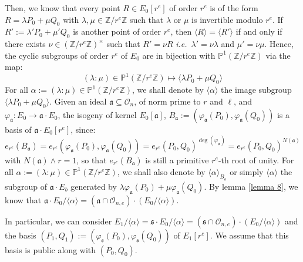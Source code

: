 \documentclass[a4paper,10pt]{report}
\theoremstyle{definition}
\theoremstyle{plain}
\theoremstyle{definition}
\newcommand{\ie}{\emph{i.e.}\ }
\newcommand{\Z}{\mathbb{Z}}
\newcommand{\mO}{\mathcal{O}}
\renewcommand{\(}{\left(}
\renewcommand{\)}{\right)}
\renewcommand{\P}{\mathbb{P}}
\newcommand{\mf}[1]{\mathfrak{#1}}
\begin{document}
Then, we know that every point $R\in E_0[r^e]$ of order $r^e$ is of the form $R=\lambda P_0+\mu Q_0$ with $\lambda,\mu\in\Z/r^e\Z$ such that $\lambda$ or $\mu$ is invertible modulo $r^e$.  If $R':=\lambda'P_0+\mu'Q_0$ is another point of order $r^e$, then $\langle R\rangle=\langle R'\rangle$ if and only if there exists $\nu\in(\Z/r^e\Z)^\times$ such that $R'=\nu R$ \ie  $\lambda'=\nu\lambda$ and $\mu'=\nu\mu$. Hence, the cyclic subgroups of order $r^e$ of $E_0$ are in bijection with $\P^1(\Z/r^e\Z)$ via the map:
\[(\lambda:\mu)\in\P^1(\Z/r^e\Z)\longmapsto \langle \lambda P_0+\mu Q_0\rangle\]
For all $\alpha:=(\lambda:\mu)\in\P^1(\Z/r^e\Z)$, we shall denote by $\langle\alpha\rangle$ the image subgroup $\langle \lambda P_0+\mu Q_0\rangle$. Given an ideal $\mf{a}\subseteq \mO_n$, of norm prime to $r$ and $\ell$, and $\varphi_{\mf{a}}: E_0\longrightarrow \mf{a}\cdot E_0$, the isogeny of kernel $E_0[\mf{a}]$, $B_{\mf{a}}:=(\varphi_{\mf{a}}(P_0), \varphi_{\mf{a}}(Q_0))$ is a basis of $\mf{a}\cdot E_0[r^e]$, since:
\[e_{r^e}(B_{\mf{a}})=e_{r^e}(\varphi_{\mf{a}}(P_0), \varphi_{\mf{a}}(Q_0))=e_{r^e}(P_0,Q_0)^{\deg(\varphi_{\mf{a}})}=e_{r^e}(P_0,Q_0)^{N(\mf{a})}\]
with $N(\mf{a})\wedge r=1$, so that $e_{r^e}(B_{\mf{a}})$ is still a primitive $r^e$-th root of unity.  For all $\alpha:=(\lambda:\mu)\in\P^1(\Z/r^e\Z)$, we shall also denote by $\langle \alpha\rangle_{B_{\mf{a}}}$ or simply $\langle \alpha\rangle$ the subgroup of $\mf{a}\cdot E_b$ generated by $\lambda\varphi_{\mf{a}}(P_0)+\mu\varphi_{\mf{a}}(Q_0)$. By lemma \ref{lemma 8}, we know that $\mf{a}\cdot E_0/\langle\alpha\rangle=(\mf{a}\cap\mO_{n,e})\cdot(E_0/\langle\alpha\rangle)$. 

In particular, we can consider $E_1/\langle\alpha\rangle=\mf{s}\cdot E_0/\langle\alpha\rangle=(\mf{s}\cap\mO_{n,e})\cdot(E_0/\langle\alpha\rangle)$ and the basis $(P_1,Q_1):=(\varphi_{\mf{s}}(P_0), \varphi_{\mf{s}}(Q_0))$ of $E_1[r^e]$. We assume that this basis is public along with $(P_0,Q_0)$. 
\end{document}
